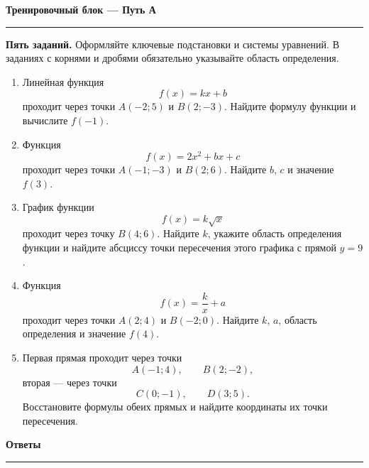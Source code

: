 \documentclass[a4paper,12pt]{article}
\newcommand{\topic}[1]{%
  \Needspace{7\baselineskip}%
  \vspace{0.45em}%
  {\Large\bfseries\color{darkaccent} #1}\par
  \vspace{0.2em}%
  {\color{accent}\rule{\linewidth}{0.7pt}}\par
  \vspace{0.35em}%
}
\begin{document}
\clearpage

\topic{Тренировочный блок --- Путь А}

\textbf{Пять заданий.}
Оформляйте ключевые подстановки и системы уравнений.
В заданиях с корнями и дробями обязательно указывайте область определения.

\begin{enumerate}[
  leftmargin=8mm,
  label=\textbf{\arabic*.},
  itemsep=1.2em
]

  \item
  Линейная функция
  \[
  f(x)=kx+b
  \]
  проходит через точки $A(-2;5)$ и $B(2;-3)$.
  Найдите формулу функции и вычислите $f(-1)$.

  \item
  Функция
  \[
  f(x)=2x^2+bx+c
  \]
  проходит через точки $A(-1;-3)$ и $B(2;6)$.
  Найдите $b$, $c$ и значение $f(3)$.

  \item
  График функции
  \[
  f(x)=k\sqrt{x}
  \]
  проходит через точку $B(4;6)$.
  Найдите $k$, укажите область определения функции и найдите абсциссу точки пересечения этого графика с прямой $y=9$.

  \item
  Функция
  \[
  f(x)=\frac{k}{x}+a
  \]
  проходит через точки $A(2;4)$ и $B(-2;0)$.
  Найдите $k$, $a$, область определения и значение $f(4)$.

  \item
  Первая прямая проходит через точки
  \[
  A(-1;4),\qquad B(2;-2),
  \]
  вторая --- через точки
  \[
  C(0;-1),\qquad D(3;5).
  \]
  Восстановите формулы обеих прямых и найдите координаты их точки пересечения.

\end{enumerate}

\clearpage

\topic{Ответы}

\renewcommand{\arraystretch}{1.55}
\end{document}
